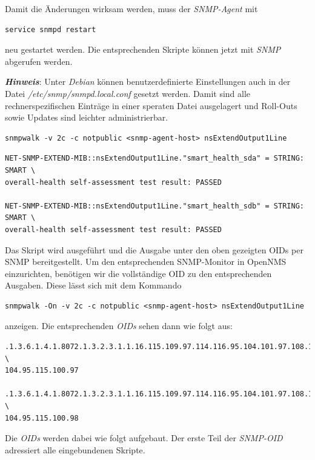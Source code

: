Damit die Änderungen wirksam werden, muss der \emph{SNMP-Agent} mit

\begin{lstlisting}[numbers=none]
service snmpd restart
\end{lstlisting}

neu gestartet werden. Die entsprechenden Skripte können jetzt mit \emph{SNMP} abgerufen werden.

\textbf{\textit{Hinweis}}: Unter \emph{Debian} können benutzerdefinierte Einstellungen auch in der Datei \emph{/etc/snmp/snmpd.local.conf} gesetzt werden. Damit sind alle rechnerspezifischen Einträge in einer speraten Datei ausgelagert und Roll-Outs sowie Updates sind leichter administrierbar.

\begin{lstlisting}[numbers=none]
snmpwalk -v 2c -c notpublic <snmp-agent-host> nsExtendOutput1Line
\end{lstlisting}

\begin{lstlisting}[numbers=none]
NET-SNMP-EXTEND-MIB::nsExtendOutput1Line."smart_health_sda" = STRING: SMART \
overall-health self-assessment test result: PASSED

NET-SNMP-EXTEND-MIB::nsExtendOutput1Line."smart_health_sdb" = STRING: SMART \
overall-health self-assessment test result: PASSED
\end{lstlisting}

Das Skript wird ausgeführt und die Ausgabe unter den oben gezeigten OIDs per SNMP bereitgestellt. Um den entsprechenden SNMP-Monitor in OpenNMS einzurichten, benötigen wir die vollständige OID zu den entsprechenden Ausgaben. Diese lässt sich mit dem Kommando

\begin{lstlisting}[numbers=none]
snmpwalk -On -v 2c -c notpublic <snmp-agent-host> nsExtendOutput1Line
\end{lstlisting}

anzeigen. Die entsprechenden \emph{OIDs} sehen dann wie folgt aus:

\begin{lstlisting}[numbers=none]
.1.3.6.1.4.1.8072.1.3.2.3.1.1.16.115.109.97.114.116.95.104.101.97.108.116. \
104.95.115.100.97

.1.3.6.1.4.1.8072.1.3.2.3.1.1.16.115.109.97.114.116.95.104.101.97.108.116. \
104.95.115.100.98
\end{lstlisting}

Die \emph{OIDs} werden dabei wie folgt aufgebaut. Der erste Teil der \emph{SNMP-OID} adressiert alle eingebundenen Skripte.

